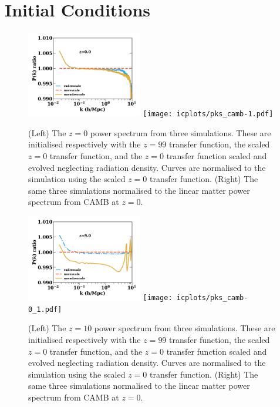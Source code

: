 \documentclass[useAMS, usenatbib]{mnras}
\begin{document}
\section{Initial Conditions}
\label{sec:initcond}

\begin{figure}
\includegraphics[width=0.45\textwidth]{icplots/pks_rel-1.pdf}
\texttt{[image: icplots/pks\_camb-1.pdf]}
  \caption{(Left) The $z=0$ power spectrum from three simulations.
  These are initialised respectively with the $z=99$ transfer function,
  the scaled $z=0$ transfer function, and the $z=0$ transfer function
  scaled and evolved neglecting radiation density.
  Curves are normalised to the simulation using the scaled $z=0$ transfer function.
  (Right) The same three simulations normalised to the linear matter
  power spectrum from CAMB at $z=0$.}
  \label{fig:rescaling0}
\end{figure}

\begin{figure}
\includegraphics[width=0.45\textwidth]{icplots/pks_rel-0_1.pdf}
\texttt{[image: icplots/pks\_camb-0\_1.pdf]}
  \caption{(Left) The $z=10$ power spectrum from three simulations.
  These are initialised respectively with the $z=99$ transfer function,
  the scaled $z=0$ transfer function, and the $z=0$ transfer function
  scaled and evolved neglecting radiation density.
  Curves are normalised to the simulation using the scaled $z=0$ transfer function.
  (Right) The same three simulations normalised to the linear matter
  power spectrum from CAMB at $z=0$.}
  \label{fig:rescaling10}
\end{figure}
\end{document}
